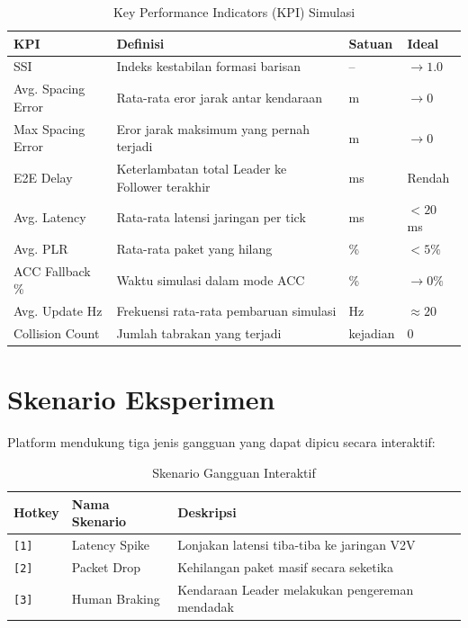 \documentclass[12pt,a4paper]{article}
\begin{document}
\begin{table}[ht]
\centering
\caption{Key Performance Indicators (KPI) Simulasi}
\begin{tabularx}{\linewidth}{lXll}
\toprule
\textbf{KPI} & \textbf{Definisi} & \textbf{Satuan} & \textbf{Ideal} \\
\midrule
SSI & Indeks kestabilan formasi barisan & -- & $\to 1.0$ \\
Avg. Spacing Error & Rata-rata eror jarak antar kendaraan & m & $\to 0$ \\
Max Spacing Error & Eror jarak maksimum yang pernah terjadi & m & $\to 0$ \\
E2E Delay & Keterlambatan total Leader ke Follower terakhir & ms & Rendah \\
Avg. Latency & Rata-rata latensi jaringan per tick & ms & $<20$ ms \\
Avg. PLR & Rata-rata paket yang hilang & \% & $<5\%$ \\
ACC Fallback \% & Waktu simulasi dalam mode ACC & \% & $\to 0\%$ \\
Avg. Update Hz & Frekuensi rata-rata pembaruan simulasi & Hz & $\approx 20$ \\
Collision Count & Jumlah tabrakan yang terjadi & kejadian & 0 \\
\bottomrule
\end{tabularx}
\end{table}

\section{Skenario Eksperimen}

Platform mendukung tiga jenis gangguan yang dapat dipicu secara interaktif:

\begin{table}[ht]
\centering
\caption{Skenario Gangguan Interaktif}
\begin{tabularx}{\linewidth}{llX}
\toprule
\textbf{Hotkey} & \textbf{Nama Skenario} & \textbf{Deskripsi} \\
\midrule
\texttt{[1]} & Latency Spike & Lonjakan latensi tiba-tiba ke jaringan V2V \\
\texttt{[2]} & Packet Drop & Kehilangan paket masif secara seketika \\
\texttt{[3]} & Human Braking & Kendaraan Leader melakukan pengereman mendadak \\
\bottomrule
\end{tabularx}
\end{table}
\end{document}
